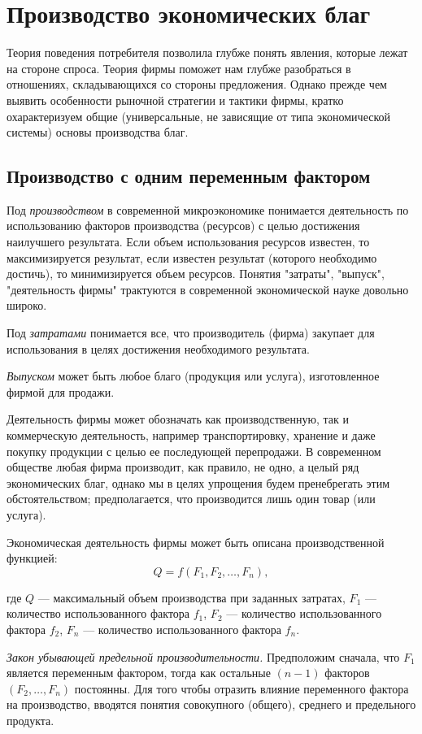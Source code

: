 \section{Производство экономических благ}
Теория поведения потребителя позволила глубже понять явления, которые лежат на
стороне спроса. Теория фирмы поможет нам глубже разобраться в отношениях,
складывающихся со стороны предложения. Однако прежде чем выявить особенности
рыночной стратегии и тактики фирмы, кратко охарактеризуем общие (универсальные,
не зависящие от типа экономической системы) основы производства благ.

\subsection{Производство с одним переменным фактором}

Под \emph{производством} в современной микроэкономике понимается деятельность
по использованию факторов производства (ресурсов) с целью достижения наилучшего
результата. Если объем использования ресурсов известен, то максимизируется
результат, если известен результат (которого необходимо достичь), то 
минимизируется объем ресурсов. Понятия "затраты", "выпуск", "деятельность
фирмы" трактуются в современной экономической науке довольно широко.

Под \emph{затратами} понимается все, что производитель (фирма) закупает для
использования в целях достижения необходимого результата.

\emph{Выпуском} может быть любое благо (продукция или услуга), изготовленное
фирмой для продажи.

Деятельность фирмы может обозначать как производственную, так и коммерческую
деятельность, например транспортировку, хранение и даже покупку продукции с
целью ее последующей перепродажи. В современном обществе любая фирма
производит, как правило, не одно, а целый ряд экономических благ, однако мы в
целях упрощения будем пренебрегать этим обстоятельством; предполагается, что
производится лишь один товар (или услуга).

Экономическая деятельность фирмы может быть описана производственной функцией:
\[
    Q = f(F_1, F_2, \ldots, F_n),
\]

где \( Q \) — максимальный объем производства при заданных затратах, \( F_1 \)
— количество использованного фактора \( f_1 \), \( F_2 \) — количество
использованного фактора \( f_2 \), \( F_n \) — количество использованного
фактора \( f_n \).

\emph{Закон убывающей предельной производительности.} Предположим сначала, что
\( F_1 \) является переменным фактором, тогда как остальные \( (n - 1) \)
факторов \( (F_2, \ldots, F_n) \) постоянны. Для того чтобы отразить влияние
переменного фактора на производство, вводятся понятия совокупного (общего),
среднего и предельного продукта.

